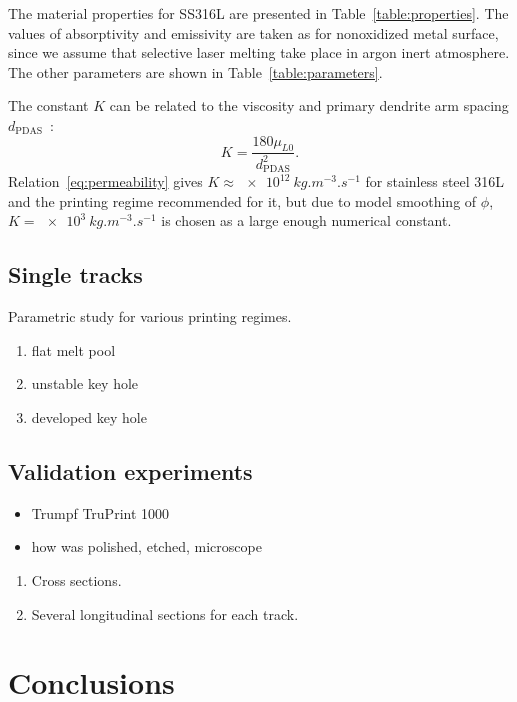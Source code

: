 \documentclass{article}
\begin{document}
The material properties for SS316L are presented in Table~\ref{table:properties}.
The values of absorptivity and emissivity are taken as for nonoxidized metal surface,
since we assume that selective laser melting take place in argon inert atmosphere.
The other parameters are shown in Table~\ref{table:parameters}.

The constant $K$ can be related to the viscosity and primary dendrite arm spacing $d_\text{PDAS}$~\cite{kubo1985mathematical}:
\begin{equation}\label{eq:permeability}
    K = \frac{180\mu_{L0}}{d_\text{PDAS}^2}.
\end{equation}
Relation~\eqref{eq:permeability} gives $K \approx \SI{e12}{kg.m^{-3}.s^{-1}}$
for stainless steel 316L and the printing regime recommended for it,
but due to model smoothing of $\phi$,
$K = \SI{e3}{kg.m^{-3}.s^{-1}}$ is chosen as a large enough numerical constant.

\subsection{Single tracks}

Parametric study for various printing regimes.
\begin{enumerate}
    \item flat melt pool
    \item unstable key hole
    \item developed key hole
\end{enumerate}

\subsection{Validation experiments}

\begin{itemize}
    \item Trumpf TruPrint 1000
    \item how was polished, etched, microscope
\end{itemize}


\begin{enumerate}
    \item Cross sections.
    \item Several longitudinal sections for each track.
\end{enumerate}

\section{Conclusions}
\end{document}
